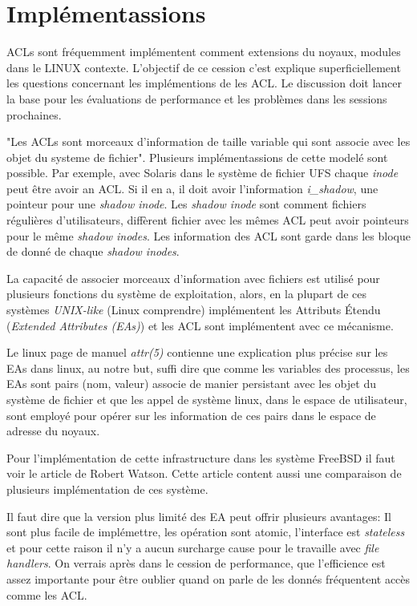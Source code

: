\section{Implémentassions}

ACLs sont fréquemment implémentent comment extensions du noyaux, modules dans le LINUX contexte. L'objectif de ce cession c'est explique superficiellement les questions concernant les implémentions de les ACL. Le discussion doit lancer la base pour les évaluations de performance et les problèmes dans les sessions prochaines.

"Les ACLs sont morceaux d'information de taille variable qui sont associe avec les objet du systeme de fichier"\cite{aclsuse}. Plusieurs implémentassions de cette modelé sont possible. Par exemple, avec Solaris dans le système de fichier UFS\cite{acl_permission} chaque \emph{inode} peut être avoir an ACL. Si il en a, il doit avoir l'information \emph{i\_shadow}, une pointeur pour une \emph{shadow inode}. Les \emph{shadow inode} sont comment fichiers régulières d'utilisateurs, diffèrent fichier avec les mêmes ACL peut avoir pointeurs pour le même \emph{shadow inodes}. Les information des ACL sont garde dans les bloque de donné de chaque \emph{shadow inodes}.

La capacité de associer morceaux d'information avec fichiers est utilisé pour plusieurs fonctions du système de exploitation, alors, en la plupart de ces systèmes \emph{UNIX-like} (Linux comprendre) implémentent les Attributs Étendu (\emph{Extended Attributes (EAs)}) et les ACL sont implémentent avec ce mécanisme.

Le linux page de manuel\cite{aclsuse} \emph{attr(5)} contienne une explication plus précise sur les EAs dans linux, au notre but, suffi dire que comme les variables des processus, les EAs sont pairs (nom, valeur) associe de manier persistant avec les objet du système de fichier et que les appel de système linux, dans le espace de utilisateur, sont employé pour opérer sur les information de ces pairs dans le espace de adresse du noyaux.

Pour l'implémentation de cette infrastructure dans les système FreeBSD il faut voir le article de Robert Watson\cite{trust}. Cette article content aussi une comparaison de plusieurs implémentation de ces système. 

Il faut dire que la version plus limité des EA peut offrir plusieurs avantages: Il sont plus facile de implémettre, les opération sont atomic, l'interface est \emph{stateless} et pour cette raison il n'y a aucun surcharge cause pour le travaille avec \emph{file handlers}. On verrais après dans le cession de performance, que l'efficience est assez importante pour être oublier quand on parle de les donnés fréquentent accès comme les ACL.   

